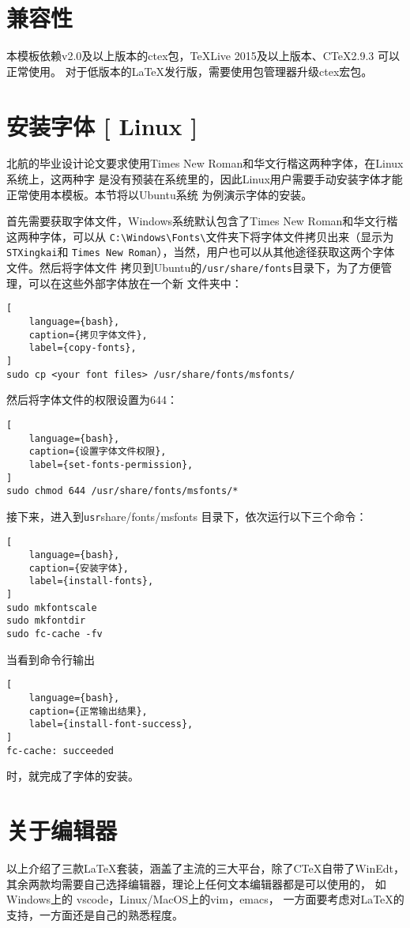 \section{兼容性}

本模板依赖v2.0及以上版本的ctex包，\TeX{}Live 2015及以上版本、C\TeX{}2.9.3 可以正常使用。
对于低版本的\LaTeX{}发行版，需要使用包管理器升级ctex宏包。

\section{安装字体 [ Linux ]}

北航的毕业设计论文要求使用Times New Roman和华文行楷这两种字体，在Linux系统上，这两种字
是没有预装在系统里的，因此Linux用户需要手动安装字体才能正常使用本模板。本节将以Ubuntu系统
为例演示字体的安装。

首先需要获取字体文件，Windows系统默认包含了Times New Roman和华文行楷这两种字体，可以从
\verb|C:\Windows\Fonts\|文件夹下将字体文件拷贝出来（显示为\verb|STXingkai|和
\verb|Times New Roman|），当然，用户也可以从其他途径获取这两个字体文件。然后将字体文件
拷贝到Ubuntu的\verb|/usr/share/fonts|目录下，为了方便管理，可以在这些外部字体放在一个新
文件夹中：
\begin{lstlisting}[
    language={bash},
    caption={拷贝字体文件},
    label={copy-fonts},
]
sudo cp <your font files> /usr/share/fonts/msfonts/
\end{lstlisting}
然后将字体文件的权限设置为644：
\begin{lstlisting}[
    language={bash},
    caption={设置字体文件权限},
    label={set-fonts-permission},
]
sudo chmod 644 /usr/share/fonts/msfonts/*
\end{lstlisting}
接下来，进入到{\verb /usr/share/fonts/msfonts } 目录下，依次运行以下三个命令：
\begin{lstlisting}[
    language={bash},
    caption={安装字体},
    label={install-fonts},
]
sudo mkfontscale
sudo mkfontdir
sudo fc-cache -fv
\end{lstlisting}
当看到命令行输出
\begin{lstlisting}[
    language={bash},
    caption={正常输出结果},
    label={install-font-success},
]
fc-cache: succeeded
\end{lstlisting}
时，就完成了字体的安装。

\section{关于编辑器}

以上介绍了三款\LaTeX{}套装，涵盖了主流的三大平台，除了C\TeX{}自带了WinEdt，
其余两款均需要自己选择编辑器，理论上任何文本编辑器都是可以使用的，
如Windows上的 vscode，Linux/MacOS上的vim，emacs，
一方面要考虑对\LaTeX{}的支持，一方面还是自己的熟悉程度。

